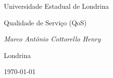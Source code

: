 \begin{titlepage}
  \centering
  \vspace*{2cm}
  {\Large Universidade Estadual de Londrina \par}
  \vspace{3cm}
  {\Huge Qualidade de Serviço (QoS) \par}
  \vspace{2cm}
  {\Large\itshape Marco Antônio Cottorello Henry \par}
  \vfill
  {\large Londrina \par}
  {\Large \today \par}
\end{titlepage}
